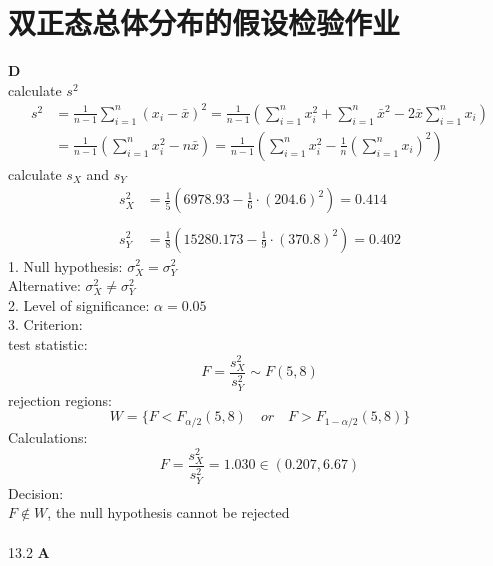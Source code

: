 \documentclass[a4paper]{ctexart}    %
\begin{document}
	\section{双正态总体分布的假设检验作业}
	 \quad \textbf{D} \\
	calculate $ s^2 $
	\begin{equation*}
		\begin{split}
			s^2 &= \frac{1}{n-1} \sum\limits_{i=1}^{n}(x_i - \bar{x})^2 = \frac{1}{n-1} \left( \sum\limits_{i=1}^{n}x_i^2 + \sum\limits_{i=1}^{n}\bar{x}^2 - 2\bar{x}\sum\limits_{i=1}^{n}x_i \right) \\
			&= \frac{1}{n-1} \left( \sum\limits_{i=1}^{n}x_i^2 - n\bar{x} \right) = \frac{1}{n-1} \left( \sum\limits_{i=1}^{n}x_i^2 - \frac{1}{n} \left( \sum\limits_{i=1}^{n} x_i \right)^2 \right)
		\end{split}
	\end{equation*}
	calculate $ s_X $ and $ s_Y $
	\begin{equation*}
		\begin{split}
			s_X^2 &= \frac{1}{5} \left( 6978.93 - \frac{1}{6}\cdot (204.6)^2\right) = 0.414 \\
			&\\
			s_Y^2 &= \frac{1}{8} \left( 15280.173 - \frac{1}{9}\cdot (370.8)^2\right) = 0.402
		\end{split}
	\end{equation*}
	1. Null hypothesis: $ \sigma_X^2 = \sigma_Y^2 $ \\
	Alternative: $ \sigma_X^2 \neq \sigma_Y^2 $ \\
	2. Level of significance: $ \alpha = 0.05 $ \\
	3. Criterion: \\
	test statistic:
	\begin{equation*}
		F = \frac{s_X^2}{s_Y^2} \sim F(5, 8)
	\end{equation*}
	rejection regions:
	\begin{equation*}
		W = \{F < F_{\alpha / 2}(5, 8)\quad or \quad F > F_{1 - \alpha / 2}(5, 8)\}
	\end{equation*}
	Calculations: \\
	\begin{equation*}
		F = \frac{s_X^2}{s_Y^2} = 1.030 \in (0.207, 6.67)
	\end{equation*}
	Decision: \\
	$ F \notin W $, the null hypothesis cannot be rejected \\ \\ 
	13.2 \quad \textbf{A} \\
\end{document}
